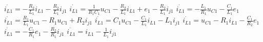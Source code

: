 $\dot{i_{L1}}=-\frac{R_2}{L_1}i_{L1}-\frac{R_2}{L_1}i_{j1}$
$\dot{i_{L1}}=\frac{1}{R_1 C_1} u_{C1}-\frac{R_2}{L_1}i_{L1}+e_1-\frac{R_2}{L_1}i_{j1}$
$\dot{i_{L1}}=-\frac{L_1}{R_1}u_{C1}-\frac{C_1}{L_1}e_{1}$
$\dot{i_{L1}}=\frac{R_1}{L_1}u_{C1}-R_1 u_{C1}+R_2 i_{j1}$
$\dot{i_{L1}}=C_1 u_{C1}-\frac{C_1}{L_1}i_{L1}-L_1 i_{j1}$
$\dot{i_{L1}}=u_{C1}-R_1 i_{L1}-\frac{C_1}{R_2}e_{1}$
$\dot{i_{L1}}=-\frac{C_1}{R_1}e_1-\frac{R_2}{R_1}i_{j1}$
$\dot{i_{L1}}=i_{L1}-\frac{1}{L_1}i_{j1}$
